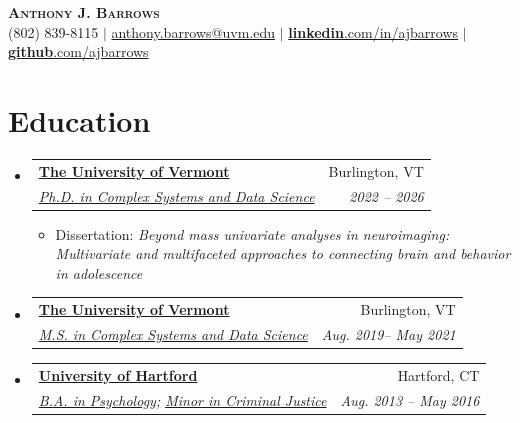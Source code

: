 \documentclass[letterpaper,11pt]{article}
\makeatletter
\newcommand{\resumeItem}[1]{
  \item\small{
    {#1 \vspace{-2pt}}
  }
}
\newcommand{\resumeSubheading}[4]{
  \vspace{-2pt}\item
    \begin{tabular*}{0.97\textwidth}[t]{l@{\extracolsep{\fill}}r}
      \textbf{#1} & #2 \\
      \textit{\small#3} & \textit{\small #4} \\
    \end{tabular*}\vspace{-7pt}
}
\newcommand{\resumeSubHeadingListStart}{\begin{itemize}[leftmargin=0.15in, label={}]}
\newcommand{\resumeSubHeadingListEnd}{\end{itemize}}
\newcommand{\resumeItemListStart}{\begin{itemize}}
\newcommand{\resumeItemListEnd}{\end{itemize}\vspace{-5pt}}
\makeatother
\begin{document}

\begin{center}
    \textbf{\Huge \scshape Anthony J. Barrows} \\ \vspace{3pt}
    \small (802) 839-8115 $|$ \href{mailto:ajbarrow@uvm.edu}{anthony.barrows@uvm.edu} $|$ 
    \href{https://linkedin.com/in/ajbarrows}{\textbf{linkedin}.com/in/ajbarrows} $|$ \href{https://github.com/ajbarrows}{\textbf{github}.com/ajbarrows}
\end{center}


\section{Education}
  \resumeSubHeadingListStart
    \resumeSubheading
      {\href{https://uvm.edu}{\textbf{The University of Vermont}}}{Burlington, VT}
      {\href{https://vermontcomplexsystems.org/}{Ph.D. in Complex Systems and Data Science}}
      {2022 -- 2026}
      \resumeItemListStart
        \resumeItem{Dissertation: \textit{Beyond mass univariate analyses in neuroimaging: Multivariate and multifaceted approaches to connecting brain and behavior in adolescence}}
      \resumeItemListEnd
    \resumeSubheading
      {\href{https://uvm.edu}{\textbf{The University of Vermont}}}{Burlington, VT}
      {\href{https://vermontcomplexsystems.org/}{M.S. in Complex Systems and Data Science}}
      {Aug. 2019-- May 2021}
    \resumeSubheading
      {\href{https://www.hartford.edu/}{\textbf{University of Hartford}}}{Hartford, CT}
      {\href{https://www.hartford.edu/academics/schools-colleges/arts-sciences/academics/departments-and-centers/psychology/default.aspx}{B.A. in Psychology;} \href{https://www.hartford.edu/academics/schools-colleges/arts-sciences/academics/departments-and-centers/sociology-and-criminal-justice/default.aspx}{Minor in Criminal Justice}}
      {Aug. 2013 -- May 2016}
  \resumeSubHeadingListEnd
\end{document}
